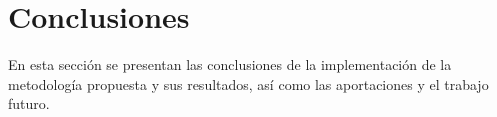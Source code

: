 \chapter{Conclusiones}

En esta sección se presentan las conclusiones de la implementación de la metodología propuesta y sus resultados, así como las aportaciones y el trabajo futuro.




